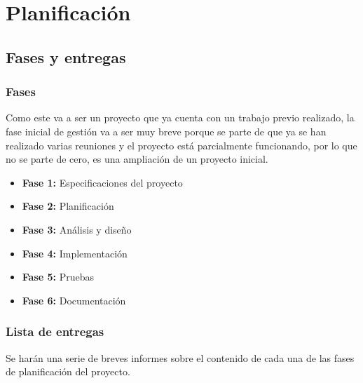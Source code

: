 \chapter{Planificación}

\section{Fases y entregas}

\subsection{Fases}

Como este va a ser un proyecto que ya cuenta con un trabajo previo realizado, la fase inicial de gestión va a ser muy breve porque se parte de que ya se han realizado varias reuniones y el proyecto está parcialmente funcionando, por lo que no se parte de cero, es una ampliación de un proyecto inicial.

\begin{itemize}
  \item \textbf{Fase 1:} Especificaciones del proyecto
  \item \textbf{Fase 2:} Planificación
  \item \textbf{Fase 3:} Análisis y diseño
  \item \textbf{Fase 4:} Implementación
  \item \textbf{Fase 5:} Pruebas
  \item \textbf{Fase 6:} Documentación
\end{itemize}

\subsection{Lista de entregas}

Se harán una serie de breves informes sobre el contenido de cada una de las fases de planificación del proyecto.

